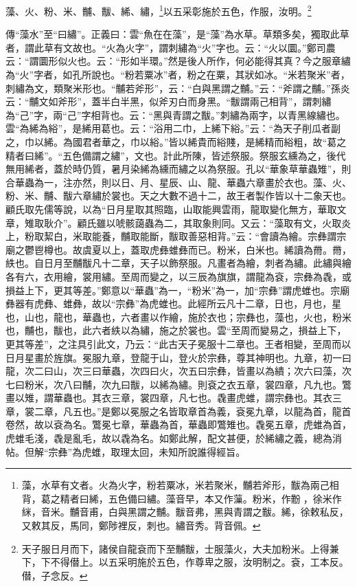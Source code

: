 藻、火、粉、米、黼、黻、絺、繡，\footnote{藻，水草有文者。火為火字，粉若粟冰，米若聚米，黼若斧形，黻為兩己相背，葛之精者曰絺，五色備曰繡。藻音早，本又作薻。粉米，作黺𪓋，徐米作{\hanaa 䋛}，音米。黼音甫，白與黑謂之黼。黻音弗，黑與青謂之黻。絺，徐敕私反，又敕其反，馬同，鄭陟裡反，刺也。繡音秀。背音佩。}以五采彰施於五色，作服，汝明。\footnote{天子服日月而下，諸侯自龍袞而下至黼黻，士服藻火，大夫加粉米。上得兼下，下不得僣上。以五采明施於五色，作尊卑之服，汝明制之。袞，工本反。僣，子念反。}


{\noindent\zhuan{}\fzbyks 傳“藻水”至“曰繡”。正義曰：雲“魚在在藻”，是“藻”為水草。草類多矣，獨取此草者，謂此草有文故也。“火為火字”，謂刺繡為“火”字也。云：“火以圜。”鄭司農云：“謂圜形似火也。云：“形如半環。”然是後人所作，何必能得其真？今之服章繡為“火”字者，如孔所說也。“粉若粟冰”者，粉之在粟，其狀如冰。“米若聚米”者，刺繡為文，類聚米形也。“黼若斧形”，云：“白與黑謂之黼。”云：“斧謂之黼。”孫炎云：“黼文如斧形”，蓋半白半黑，似斧刃白而身黑。“黻謂兩己相背”，謂刺繡為“己”字，兩“己”字相背也。云：“黑與青謂之黻。”刺繡為兩字，以青黑線繡也。雲“為絺為綌”，是絺用葛也。云：“浴用二巾，上絺下綌。”云：“為天子削瓜者副之，巾以絺。為國君者華之，巾以綌。”皆以絺貴而綌賤，是絺精而綌粗，故“葛之精者曰絺”。“五色備謂之繡”，文也。計此所陳，皆述祭服。祭服玄纁為之，後代無用絺者，蓋於時仍質，暑月染絺為纁而繡之以為祭服。孔以“華象草華蟲雉”，則合華蟲為一，注亦然，則以日、月、星辰、山、龍、華蟲六章畫於衣也。藻、火、粉、米、黼、黻六章繡於裳也。天之大數不過十二，故王者製作皆以十二象天也。顧氏取先儒等說，以為“日月星取其照臨，山取能興雲雨，龍取變化無方，華取文章，雉取耿介”。顧氏雖以唬骸藹蟲為二，其取象則同。又云：“藻取有文，火取炎上，粉取絜白，米取能養，黼取能斷，黻取善惡相背。”云：“會讀為繪。宗彝謂宗廟之鬱鬯樽也。故虞夏以上，蓋取虎彝蜼彝而已。粉米，白米也。絺讀為黹。黹，紩也。自日月至黼黻凡十二章，天子以飾祭服。凡畫者為繪，刺者為繡。此繡與繪各有六，衣用繪，裳用繡。至周而變之，以三辰為旗旗，謂龍為袞，宗彝為毳，或損益上下，更其等差。”鄭意以“華蟲”為一，“粉米”為一，加“宗彝”謂虎蜼也。宗廟彝器有虎彝、蜼彝，故以“宗彝”為虎蜼也。此經所云凡十二章，日也，月也，星也，山也，龍也，華蟲也，六者畫以作繪，施於衣也；宗彝也，藻也，火也，粉米也，黼也，黻也，此六者紩以為繡，施之於裳也。雲“至周而變易之，損益上下，更其等差”，之注具引此文，乃云：“此古天子冕服十二章也。王者相變，至周而以日月星畫於旌旗。冕服九章，登龍于山，登火於宗彝，尊其神明也。九章，初一曰龍，次二曰山，次三曰華蟲，次四曰火，次五曰宗彝，皆畫以為繢；次六曰藻，次七曰粉米，次八曰黼，次九曰黻，以絺為繡。則袞之衣五章，裳四章，凡九也。鷩畫以雉，謂華蟲也。其衣三章，裳四章，凡七也。毳畫虎蜼，謂宗彝也。其衣三章，裳二章，凡五也。”是鄭以冕服之名皆取章首為義，袞冕九章，以龍為首，龍首卷然，故以袞為名。鷩冕七章，華蟲為首，華蟲即鷩雉也。毳冕五章，虎蜼為首，虎蜼毛淺，毳是亂毛，故以毳為名。如鄭此解，配文甚便，於絺繡之義，總為消帖。但解“宗彝”為虎蜼，取理太回，未知所說誰得經旨。 \par}

